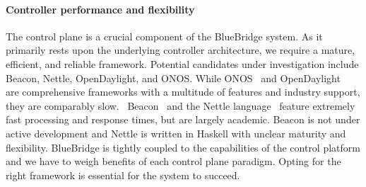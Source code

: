 \paragraph{\textbf{Controller performance and flexibility}}
The control plane is a crucial component of the BlueBridge system. As it primarily rests upon the underlying controller architecture, we require a mature, efficient, and reliable framework.
Potential candidates under investigation include Beacon, Nettle, OpenDaylight, and ONOS. While ONOS~\cite{onos} and OpenDaylight~\cite{odl} are comprehensive frameworks with a multitude of features and industry support, they are comparably slow.~\cite{controller_perf1} Beacon~\cite{beacon} and the Nettle language~\cite{controller_perf2} feature extremely fast processing and response times, but are largely academic. Beacon is not under active development and Nettle is written in Haskell with unclear maturity and flexibility. 
BlueBridge is tightly coupled to the capabilities of the control platform and we have to weigh benefits of each control plane paradigm. Opting for the right framework is essential for the system to succeed.



